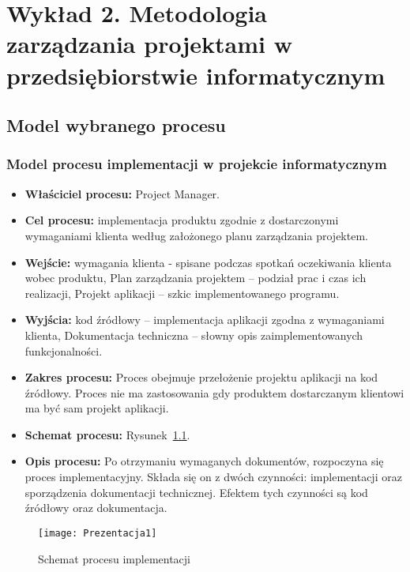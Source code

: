 \chapter{Wykład 2. Metodologia zarządzania projektami w przedsiębiorstwie informatycznym}

\section{Model wybranego procesu}

\subsection*{Model procesu implementacji w projekcie informatycznym}

\begin{itemize}
\item \textbf{Właściciel procesu:} Project Manager.
\item \textbf{Cel procesu:} implementacja produktu zgodnie z dostarczonymi wymaganiami klienta według założonego planu zarządzania projektem.
\item \textbf{Wejście:} wymagania klienta - spisane podczas spotkań oczekiwania klienta wobec produktu, Plan zarządzania projektem – podział prac i czas ich realizacji, Projekt aplikacji – szkic implementowanego programu.
\item \textbf{Wyjścia:} kod źródłowy – implementacja aplikacji zgodna z wymaganiami klienta, Dokumentacja techniczna – słowny opis zaimplementowanych funkcjonalności.
\item \textbf{Zakres procesu:} Proces obejmuje przełożenie projektu aplikacji na kod źródłowy. Proces nie ma zastosowania gdy produktem dostarczanym klientowi ma być sam projekt aplikacji.
\item \textbf{Schemat procesu:} Rysunek~\ref{schematProcesuImplementacji}.
\item \textbf{Opis procesu:} Po otrzymaniu wymaganych dokumentów, rozpoczyna się proces implementacyjny. Składa się on z dwóch czynności: implementacji oraz sporządzenia dokumentacji technicznej. Efektem tych czynności są kod źródłowy oraz dokumentacja.
\end{itemize}

\begin{figure}[!h]
\centering
\texttt{[image: Prezentacja1]}
\caption{Schemat procesu implementacji}
\label{schematProcesuImplementacji}
\end{figure}

